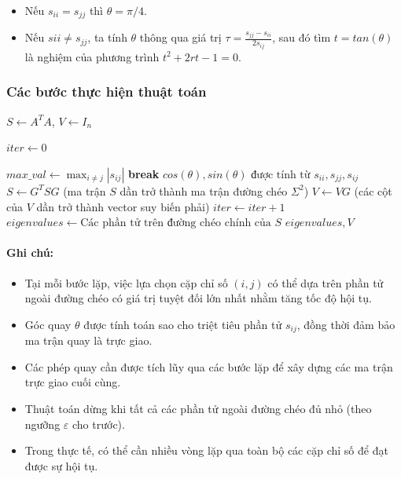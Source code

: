 \begin{itemize}[topsep=0pt, itemsep=2.5pt, leftmargin=1.5cm]
    \item Nếu $s_{ii} = s_{jj}$ thì $\theta = \pi/4$.
    \item Nếu $s{ii} \neq s_{jj}$, ta tính $\theta$ thông qua giá trị $\tau = \frac{s_{jj} - s_{ii}}{2s_{ij}}$, sau đó tìm $t = tan(\theta)$ là nghiệm của phương trình $t^2 + 2rt - 1 = 0$.
\end{itemize}

\newpage

\subsubsection{Các bước thực hiện thuật toán}

\begin{algorithm}[H]
\caption{}
\begin{algorithmic}[1]
    \State $S \gets A^TA$, $V \gets I_n$
    
    \State $iter \gets 0$

        \State $max\_val \gets \max_{i \neq j}|s_{ij}|$
             \State \textbf{break}
         \EndIf
         \State $cos(\theta), sin(\theta) \text{ được tính từ } s_{ii}, s_{jj}, s_{ij}$
         \State $S \gets G^T S G$ (ma trận $S$ dần trở thành ma trận đường chéo $\Sigma^2$)
         \State $V \gets V G$ (các cột của $V$ dần trở thành vector suy biến phải)
        \State $iter \gets iter + 1$
     \EndWhile
    \State $eigenvalues \gets \text{Các phần tử trên đường chéo chính của } S$
    \State \Return $eigenvalues, V$
\EndProcedure
\end{algorithmic}
\end{algorithm}

\paragraph{Ghi chú:}
\begin{itemize}[itemsep=2.5pt, leftmargin=1cm]
    \item Tại mỗi bước lặp, việc lựa chọn cặp chỉ số $(i, j)$ có thể dựa trên phần tử ngoài đường chéo có giá trị tuyệt đối lớn nhất nhằm tăng tốc độ hội tụ.
    
    \item Góc quay $\theta$ được tính toán sao cho triệt tiêu phần tử $s_{ij}$, đồng thời đảm bảo ma trận quay là trực giao.
    
    \item Các phép quay cần được tích lũy qua các bước lặp để xây dựng các ma trận trực giao cuối cùng.
    
    \item Thuật toán dừng khi tất cả các phần tử ngoài đường chéo đủ nhỏ (theo ngưỡng $\varepsilon$ cho trước).
    
    \item Trong thực tế, có thể cần nhiều vòng lặp qua toàn bộ các cặp chỉ số để đạt được sự hội tụ.
\end{itemize}

